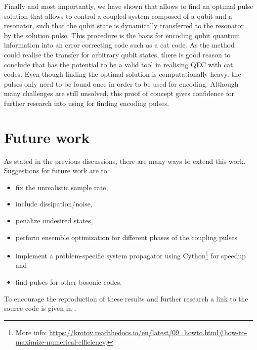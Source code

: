 \documentclass[main.tex]{subfiles}
\begin{document}
Finally and most importantly, we have shown that \krotov{} allows to find an optimal pulse solution that allows to control a coupled system composed of a qubit and a resonator, such that the qubit state is dynamically transferred to the resonator by the solution pulse.
This procedure is the basis for encoding qubit quantum information into an error correcting code such as a cat code.
As the method could realise the transfer for arbitrary qubit states, there is good reason to conclude that \krotov{} has the potential to be a valid tool in realising QEC with cat codes.
Even though finding the optimal solution is computationally heavy, the pulses only need to be found once in order to be used for encoding.
Although many challenges are still unsolved, this proof of concept gives confidence for further research into using \krotov{} for finding encoding pulses.

\section{Future work}%
\label{sec:future-work}
As stated in the previous discussions, there are many ways to extend this work.
Suggestions for future work are to:
\begin{itemize}
    \item fix the unrealistic sample rate,
    \item include dissipation/noise,
    \item penalize undesired states,
    \item perform ensemble optimization for different phases of the coupling pulses
    \item implement a problem-specific system propagator using Cython\footnote{More info: \url{https://krotov.readthedocs.io/en/latest/09_howto.html\#how-to-maximize-numerical-efficiency}.} for speedup and
    \item find pulses for other bosonic codes.
\end{itemize}
To encourage the reproduction of these results and further research a link to the source code is given in .
\end{document}
